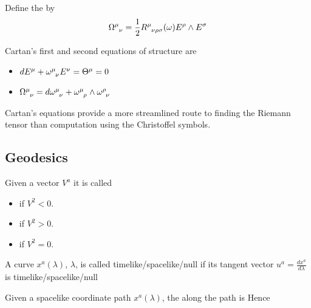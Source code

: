 \documentclass{article}
\begin{document}
\begin{definition}
Define the  by 
\[
\Omega\indices{^\mu_\nu} = \frac{1}{2} R\indices{^\mu_\nu_\rho_\sigma}(\omega) E^\rho \wedge E^\sigma
\]
\end{definition}

\begin{theorem}
Cartan's first and second equations of structure are 
\begin{itemize}
    \item $dE^\mu +  \omega\indices{^\mu_\nu} E^\nu = \Theta^\mu = 0 $ 
    \item $\Omega\indices{^\mu_\nu} = d\omega\indices{^\mu_\nu} +  \omega\indices{^\mu_\rho} \wedge  \omega\indices{^\rho_\nu}$
\end{itemize}
\end{theorem}

\begin{idea}
Cartan's equations provide a more streamlined route to finding the Riemann tensor than computation using the Christoffel symbols. 
\end{idea}

\subsection{Geodesics}

\begin{definition}
Given a vector $V^a$ it is called 
\begin{itemize}
\item {} if $V^2 < 0$.
\item {} if $V^2 > 0$.
\item {} if $V^2 = 0$.
\end{itemize}
A curve $x^a(\lambda)$, $\lambda$, is called timelike/spacelike/null if its tangent vector $u^a = \frac{dx^a}{d\lambda}$ is timelike/spacelike/null
\end{definition}

\begin{definition}
Given a spacelike coordinate path $x^a(\lambda)$, the  along the path is 
Hence 
\end{definition}
\end{document}
